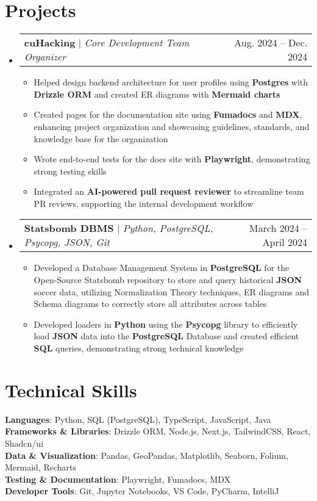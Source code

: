 \documentclass[letterpaper,11pt]{article}
\makeatletter
\newcommand{\resumeItem}[1]{
  \item\small{
    {#1 \vspace{-2pt}}
  }
}
\newcommand{\resumeProjectHeading}[2]{
    \item
    \begin{tabular*}{0.97\textwidth}{l@{\extracolsep{\fill}}r}
      \small#1 & #2 \\
    \end{tabular*}\vspace{-7pt}
}
\newcommand{\resumeSubHeadingListStart}{\begin{itemize}[leftmargin=0.15in, label={}]}
\newcommand{\resumeSubHeadingListEnd}{\end{itemize}}
\newcommand{\resumeItemListStart}{\begin{itemize}}
\newcommand{\resumeItemListEnd}{\end{itemize}\vspace{-5pt}}
\makeatother
\begin{document}
\section{Projects}
    \resumeSubHeadingListStart
      \resumeProjectHeading
      {\textbf{cuHacking} $|$ \emph{Core Development Team Organizer}}{Aug.  2024 -- Dec. 2024}
          \resumeItemListStart
           \resumeItem{Helped design backend architecture for user profiles using \textbf{Postgres} with \textbf{Drizzle ORM} and created ER diagrams with \textbf{Mermaid charts}}
          \resumeItem{Created pages for the documentation site using \textbf{Fumadocs} and \textbf{MDX}, enhancing project organization and showcasing guidelines, standards, and knowledge base for the organization}
          \resumeItem{Wrote end-to-end tests for the docs site with \textbf{Playwright}, demonstrating strong testing skills}
          \resumeItem{Integrated an \textbf{AI-powered pull request reviewer} to streamline team PR reviews, supporting the internal development workflow}
          \resumeItemListEnd
      \resumeProjectHeading
          {\textbf{Statsbomb DBMS} $|$ \emph{Python, PostgreSQL, Psycopg, JSON, Git}}{March 2024 -- April 2024}
          \resumeItemListStart
            \resumeItem{Developed a Database Management System in \textbf{PostgreSQL} for the Open-Source Statsbomb repository to store and query historical \textbf{JSON} soccer data, utilizing Normalization Theory techniques, ER diagrams and Schema diagrams to correctly store all attributes across tables}
            \resumeItem{Developed loaders in \textbf{Python} using the \textbf{Psycopg} library to efficiently load \textbf{JSON} data into the \textbf{PostgreSQL} Database and created efficient \textbf{SQL} queries, demonstrating strong technical knowledge}
          \resumeItemListEnd
    \resumeSubHeadingListEnd



%
\section{Technical Skills}
 \begin{itemize}[leftmargin=0.15in, label={}]
    \small{\item{
    \textbf{Languages}{: Python, SQL (PostgreSQL), TypeScript, JavaScript, Java} \\
     \textbf{Frameworks \& Libraries}{: Drizzle ORM, Node.js, Next.js, TailwindCSS, React, Shadcn/ui} \\
     \textbf{Data \& Visualization}{: Pandas, GeoPandas, Matplotlib, Seaborn, Folium, Mermaid, Recharts} \\
     \textbf{Testing \& Documentation}{: Playwright, Fumadocs, MDX} \\
     \textbf{Developer Tools}{: Git, Jupyter Notebooks, VS Code, PyCharm, IntelliJ} \\
    }}
 \end{itemize}


\end{document}
